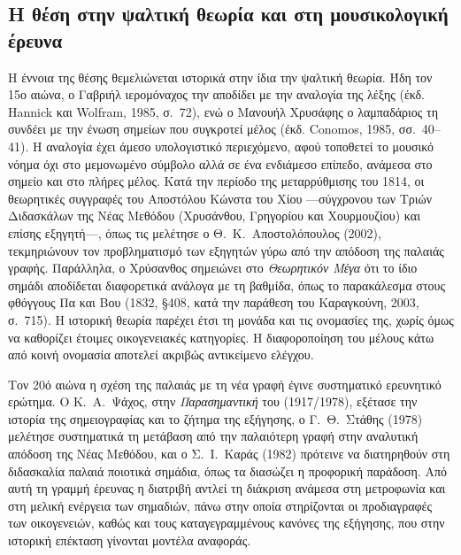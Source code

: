\documentclass[a4paper]{article}
\begin{document}
\subsection{Η θέση στην ψαλτική θεωρία και στη μουσικολογική έρευνα}\label{sec:lit-mus}
Η έννοια της θέσης θεμελιώνεται ιστορικά στην ίδια την ψαλτική θεωρία. Ήδη τον 15ο αιώνα, ο Γαβριήλ ιερομόναχος την αποδίδει με την αναλογία της λέξης (έκδ. Hannick και Wolfram, 1985, σ.~72), ενώ ο Μανουήλ Χρυσάφης ο λαμπαδάριος τη συνδέει με την ένωση σημείων που συγκροτεί μέλος (έκδ. Conomos, 1985, σσ.~40--41). Η αναλογία έχει άμεσο υπολογιστικό περιεχόμενο, αφού τοποθετεί το μουσικό νόημα όχι στο μεμονωμένο σύμβολο αλλά σε ένα ενδιάμεσο επίπεδο, ανάμεσα στο σημείο και στο πλήρες μέλος. Κατά την περίοδο της μεταρρύθμισης του 1814, οι θεωρητικές συγγραφές του Αποστόλου Κώνστα του Χίου —σύγχρονου των Τριών Διδασκάλων της Νέας Μεθόδου (Χρυσάνθου, Γρηγορίου και Χουρμουζίου) και επίσης εξηγητή—, όπως τις μελέτησε ο Θ.~Κ.~Αποστολόπουλος (2002), τεκμηριώνουν τον προβληματισμό των εξηγητών γύρω από την απόδοση της παλαιάς γραφής. Παράλληλα, ο Χρύσανθος σημειώνει στο \emph{Θεωρητικόν Μέγα} ότι το ίδιο σημάδι αποδίδεται διαφορετικά ανάλογα με τη βαθμίδα, όπως το παρακάλεσμα στους φθόγγους Πα και Βου (1832, §408, κατά την παράθεση του Καραγκούνη, 2003, σ.~715). Η ιστορική θεωρία παρέχει έτσι τη μονάδα και τις ονομασίες της, χωρίς όμως να καθορίζει έτοιμες οικογενειακές κατηγορίες. Η διαφοροποίηση του μέλους κάτω από κοινή ονομασία αποτελεί ακριβώς αντικείμενο ελέγχου.

Τον 20ό αιώνα η σχέση της παλαιάς με τη νέα γραφή έγινε συστηματικό ερευνητικό ερώτημα. Ο Κ.~Α.~Ψάχος, στην \emph{Παρασημαντική} του (1917/1978), εξέτασε την ιστορία της σημειογραφίας και το ζήτημα της εξήγησης, ο Γ.~Θ.~Στάθης (1978) μελέτησε συστηματικά τη μετάβαση από την παλαιότερη γραφή στην αναλυτική απόδοση της Νέας Μεθόδου, και ο Σ.~Ι.~Καράς (1982) πρότεινε να διατηρηθούν στη διδασκαλία παλαιά ποιοτικά σημάδια, όπως τα διασώζει η προφορική παράδοση. Από αυτή τη γραμμή έρευνας η διατριβή αντλεί τη διάκριση ανάμεσα στη μετροφωνία και στη μελική ενέργεια των σημαδιών, πάνω στην οποία στηρίζονται οι προδιαγραφές των οικογενειών, καθώς και τους καταγεγραμμένους κανόνες της εξήγησης, που στην ιστορική επέκταση γίνονται μοντέλα αναφοράς.
\end{document}
